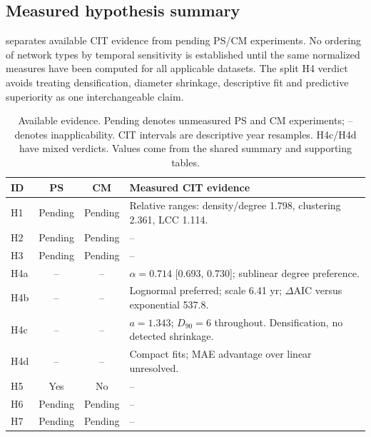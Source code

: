 \subsection{Measured hypothesis summary}
\label{sec:r-cross}
 separates available CIT evidence from pending PS/CM experiments.
No ordering of network types by temporal sensitivity is established until the
same normalized measures have been computed for all applicable datasets.
The split H4 verdict avoids treating densification, diameter shrinkage,
descriptive fit and predictive superiority as one interchangeable claim.

\begin{table}[t]
\centering\small
\setlength{\tabcolsep}{4pt}
\begin{tabular}{@{}lcc p{3.8cm}@{}}
\toprule
ID & PS & CM & Measured CIT evidence \\
\midrule
H1 & Pending & Pending & Relative ranges: density/degree 1.798, clustering 2.361, LCC 1.114.\\
H2 & Pending & Pending & --\\
H3 & Pending & Pending & --\\
H4a & -- & -- & $\alpha=0.714$ [0.693, 0.730]; sublinear degree preference.\\
H4b & -- & -- & Lognormal preferred; scale 6.41 yr; $\Delta$AIC versus exponential 537.8.\\
H4c & -- & -- & $a=1.343$; $D_{90}=6$ throughout. Densification, no detected shrinkage.\\
H4d & -- & -- & Compact fits; MAE advantage over linear unresolved.\\
H5 & Yes & No & --\\ %
H6 & Pending & Pending & --\\
H7 & Pending & Pending & --\\
\bottomrule
\end{tabular}
\caption{Available evidence. Pending denotes unmeasured PS and CM experiments;
-- denotes inapplicability. CIT intervals are descriptive year resamples.
H4c/H4d have mixed verdicts. Values come from the shared summary and supporting tables.}
\label{tab:cross}
\end{table}
